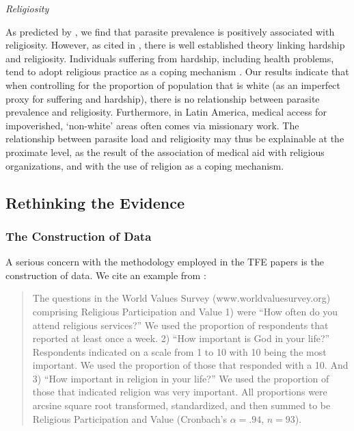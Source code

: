 \documentclass[12pt]{article}
\begin{document}
\noindent\textit{Religiosity}

	As predicted by \citet{Fincher2012}, we find that parasite prevalence is positively associated with religiosity. However, as cited in \citet{Fincher2012}, there is well established theory linking hardship and religiosity.  Individuals suffering from hardship, including health problems, tend to adopt religious practice as a coping mechanism \citep{koenig2001religion}.  Our results indicate that when controlling for the proportion of population that is white (as an imperfect proxy for suffering and hardship), there is no relationship between parasite prevalence and religiosity.  Furthermore, in Latin America, medical access for impoverished, `non-white' areas often comes via missionary work. The relationship between parasite load and religiosity may thus be explainable at the proximate level, as the result of the association of medical aid with religious organizations, and with the use of religion as a coping mechanism.
	
	

\subsection{Rethinking the Evidence}
\subsubsection{The Construction of Data}
	A serious concern with the methodology employed in the TFE papers is the construction of data. We cite an example from \citet[Electronic Supplement 1.D.]{Fincher2012}:
\begin{quote}
\small
The questions in the World Values Survey (www.worldvaluesurvey.org) comprising Religious Participation and Value 1) were ``How often do you attend religious services?'' We used the proportion of respondents that reported at least once a week. 2) ``How important is God in your life?'' Respondents indicated on a scale from 1 to 10 with 10 being the most important. We used the proportion of those that responded with a 10. And 3) ``How important in religion in your life?'' We used the proportion of those that
indicated religion was very important. All proportions were arcsine square root transformed, standardized, and then summed to be Religious Participation and Value (Cronbach's $\alpha = .94$, $n = 93$).
\end{quote}
\end{document}

